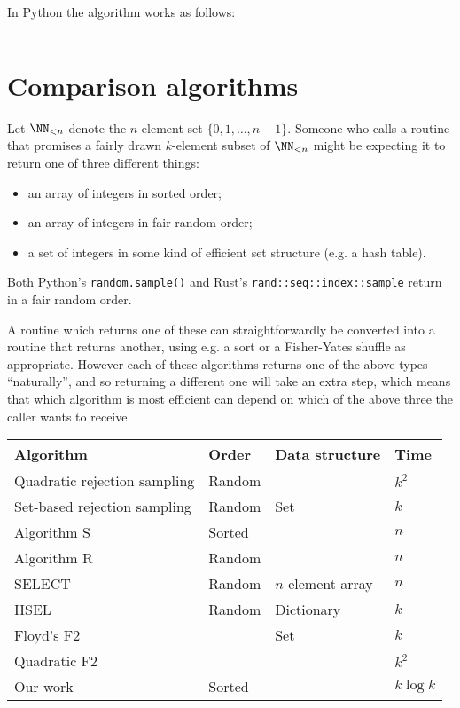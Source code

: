 \documentclass[letterpaper,luatex,11pt]{article}
\begin{document}
In Python the algorithm works as follows:

\inputminted{Python}{code/cardchoose.py}

\section{Comparison algorithms}\label{priorwork}
Let \(\NN_{<n}\) denote the \(n\)-element set \(\{0, 1, \ldots, n-1\}\). Someone who calls a routine that promises a fairly drawn \(k\)-element subset of
\(\NN_{<n}\) might be expecting it to return one of three different things:

\begin{itemize}
    \item an array of integers in sorted order;
    \item an array of integers in fair random order;
    \item a set of integers in some kind of efficient set structure (e.g. a hash table).
\end{itemize}

Both Python's \texttt{random.sample()} and 
Rust's \texttt{rand::seq::index::sample} return in a fair random order.

A routine which returns one of these can straightforwardly be converted into 
a routine that returns another, using e.g. a sort or a Fisher-Yates shuffle as appropriate.
However each of these algorithms returns one of the above types ``naturally'', and
so returning a different one will take an extra step, which means that which algorithm
is most efficient can depend on which of the above three the caller wants to receive.

\begin{center}
    \begin{tabular}{l|l|l|l}
    Algorithm & Order & Data structure & Time \\
    \hline
    Quadratic rejection sampling & Random &  & \(k^2\) \\
    Set-based rejection sampling & Random & Set & \(k\) \\
    Algorithm S & Sorted &  & \(n\) \\
    Algorithm R & Random &  & \(n\) \\
    SELECT & Random & \(n\)-element array & \(n\) \\
    HSEL & Random & Dictionary & \(k\) \\
    Floyd's F2 &  & Set & \(k\) \\
    Quadratic F2 &  & & \(k^2\) \\
    Our work & Sorted &  & \(k \log k\)
    \end{tabular}
\end{center}
\end{document}
